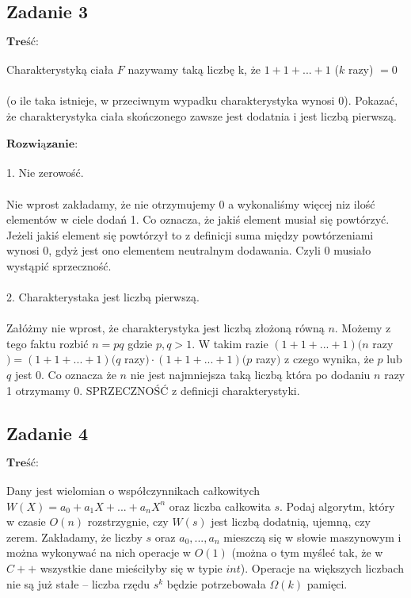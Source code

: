  
\subsection{Zadanie 3}

$\textbf{Treść:}$  \\
\\
Charakterystyką ciała $F$ nazywamy taką liczbę k, że $1 + 1 + . . . + 1$ ($k$ razy) $ = 0$ \\ \\
(o ile taka istnieje, w przeciwnym wypadku charakterystyka wynosi $0$). Pokazać, że
charakterystyka ciała skończonego zawsze jest dodatnia i jest liczbą pierwszą.
\\ \\
$\textbf{Rozwiązanie:}$ \\ \\
 1. Nie zerowość. \\ \\
 Nie wprost zakładamy, że nie otrzymujemy 0 a wykonaliśmy więcej niz ilość elementów w ciele dodań 1. Co oznacza, że jakiś element musiał się powtórzyć. Jeżeli jakiś element się powtórzył to z definicji suma między powtórzeniami wynosi 0, gdyż jest ono elementem neutralnym dodawania. Czyli 0 musiało wystąpić sprzeczność.
 \\
 \\
 2. Charakterystaka jest liczbą pierwszą.\\ \\
 Załóżmy nie wprost, że charakterystyka jest liczbą złożoną równą $n$. Możemy z tego faktu rozbić $n = pq$ gdzie $p,q > 1$. W takim razie $(1+1+...+1) (n$ razy$) = (1+1+...+1) (q$ razy$) \cdot (1+1+...+1) (p$ razy$)$ z czego wynika, że $p$ lub $q$ jest 0. Co oznacza że $n$ nie jest najmniejsza taką liczbą która po dodaniu $n$ razy 1 otrzymamy 0. SPRZECZNOŚĆ z definicji charakterystyki.
 
 \subsection{Zadanie 4} 
 
 $\textbf{Treść:}$  \\
\\
Dany jest wielomian o współczynnikach całkowitych $W(X) = a_0 + a_1X +
... + a_nX^n$ oraz liczba całkowita $s$. Podaj algorytm, który w czasie $O(n)$ rozstrzygnie,
czy $W(s)$ jest liczbą dodatnią, ujemną, czy zerem.
Zakładamy, że liczby $s$ oraz $a_0, ..., a_n$ mieszczą się w słowie maszynowym i można
wykonywać na nich operacje w $O(1)$ (można o tym myśleć tak, że w $C++$ wszystkie dane
mieściłyby się w typie $int$). Operacje na większych liczbach nie są już stałe – liczba rzędu
$s^k$
będzie potrzebowała $\Omega(k)$ pamięci.


